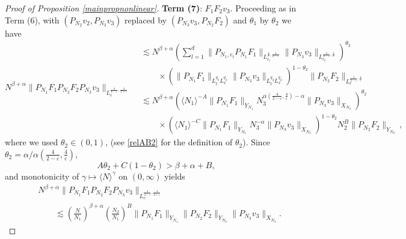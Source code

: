 \documentclass[aihp]{imsart}
\numberwithin{equation}{section}
\theoremstyle{plain}
\theoremstyle{remark}
\begin{document}
\begin{proof}[Proof of Proposition \ref{mainpropnonlinear}]
\textbf{Term (7)}: $F_1 F_2 v_3$.
Proceeding as in Term (6), with $(P_{N_2}v_2, P_{N_3}v_3)$ replaced by $(P_{N_3}v_3, P_{N_2}F_2)$ and $\theta_1$ by $\theta_2$ we have
\begin{equation*}
N^{\beta +\alpha} \|P_{N_1}F_1  P_{N_2} F_2 P_{N_3} v_3\|_{L^{\frac{4}{4-\varepsilon} ,\frac{4}{2+\varepsilon}}_e}
\begin{aligned}
 & \lesssim  N^{\beta +\alpha} \left(\sum_{l=1}^d \|P_{N_1 ,e_l}P_{N_1} F_1\|_{L_{e_l}^{\frac{4}{\varepsilon} ,\frac{4}{2-\varepsilon} }}  \|P_{N_3} v_3\|_{L_{e_l}^{\frac{4}{2-\varepsilon}, \frac{4}{\varepsilon}}} 
 \right)^{\theta_2}  \\
& \qquad \times (\|P_{N_1}F_1\|_{L_t^{q_3}L_x^{ q_3 }} \|P_{N_3}v_3 \|_{L_t^{q_2 }L_x^{q_2} } )^{1-\theta_2}  \|P_{N_2}F_2\|_{L_{e}^{\frac{4}{2-\varepsilon} ,\frac{ 4}{\varepsilon}}} \\
&\lesssim  N^{\beta +\alpha} (\langle N_1 \rangle^{-A} \| P_{N_1}F_1\|_{Y_{N_1}} N_3^{\alpha (\frac{4}{2-\varepsilon} ,\frac{4}{\varepsilon}) -\alpha} \|P_{N_3}v_3\|_{X_{N_3}} )^{\theta_2} \\ 
&\qquad \times (\langle N_1\rangle^{-C}\|P_{N_1} F_1\|_{Y_{N_1}}N_3^{-\alpha} \|P_{N_3}v_3 \|_{X_{N_3}} )^{1-\theta_2}  N_2^{B}\|P_{N_2} F_2\|_{Y_{N_2}} \,,
\end{aligned}
\end{equation*}
where we used $\theta_2 \in (0, 1)$, (see \eqref{relAB2} for the definition of $\theta_2$).
Since $\theta_2 = \alpha/\alpha (\frac{4}{2-\varepsilon} ,\frac{4}{\varepsilon})$,
$$A\theta_2 +C(1-\theta_2 )> \beta +\alpha +B,$$
and monotonicity of $\gamma \mapsto \langle N \rangle^{\gamma}$ on $(0, \infty)$ yields
\begin{align*}
&N^{\beta +\alpha} \|P_{N_1}F_1  P_{N_2} F_2 P_{N_3} v_3\|_{L^{\frac{4}{4-\varepsilon} ,\frac{4}{2+\varepsilon}}_e}\\
&\qquad \lesssim \left(\frac{N}{N_1}\right)^{\beta +\alpha} \left(\frac{N_2 }{N_1}\right)^{B }
 \|P_{N_1}F_1\|_{Y_{N_1}}  \|P_{N_2}F_2\|_{Y_{N_2}}   \|P_{N_3}v_3\|_{X_{N_3}}. 
\end{align*}









\end{proof}
\end{document}
